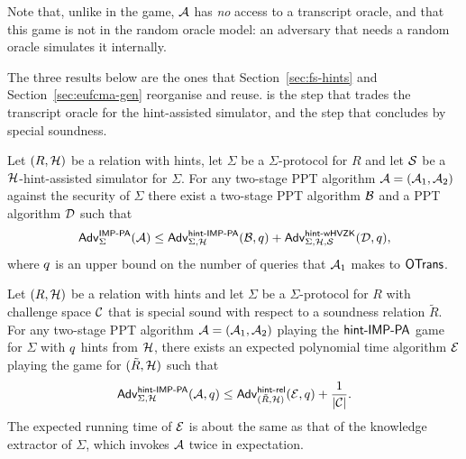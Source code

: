 Note that, unlike in the \IMPPA game, $\mathcal{A}$ has \emph{no} access to a
transcript oracle, and that this game is not in the random oracle model: an
adversary that needs a random oracle simulates it internally.

The three results below are the ones that Section~\ref{sec:fs-hints} and
Section~\ref{sec:eufcma-gen} reorganise and reuse.
 is the step that trades the transcript oracle for the
hint-assisted simulator, and  the step that concludes by
special soundness.

\begin{lemma}\label{lem:hint-imppa}
    Let $(R, \mathcal{H})$ be a relation with hints, let $\Sigma$ be a
    $\Sigma$-protocol for $R$ and let $\operatorname{\mathcal{S}}$ be a $\mathcal{H}$-hint-assisted
    simulator for $\Sigma$.
    For any two-stage PPT algorithm $\mathcal{A} = (\mathcal{A}_1, \mathcal{A}_2)$ against the
    \IMPPA security of $\Sigma$ there exist a two-stage PPT algorithm $\mathcal{B}$ and
    a PPT algorithm $\mathcal{D}$ such that
    \begin{equation}
        \mathsf{Adv}^{\mathsf{IMP}\text{-}\mathsf{PA}}_{\Sigma}(\mathcal{A}) \leq
        \mathsf{Adv}^{\mathsf{hint}\text{-}\mathsf{IMP}\text{-}\mathsf{PA}}_{\Sigma,\mathcal{H}}(\mathcal{B},q)
        + \mathsf{Adv}^{\mathsf{hint}\text{-}\mathsf{wHVZK}}_{\Sigma,\mathcal{H}, \operatorname{\mathcal{S}}}(\mathcal{D}, q),
    \end{equation}
    where $q$ is an upper bound on the number of queries that $\mathcal{A}_1$
    makes to $\mathsf{OTrans}$.
\end{lemma}

\begin{lemma}\label{lem:ss-hints}
    Let $(R, \mathcal{H})$ be a relation with hints and let $\Sigma$ be a
    $\Sigma$-protocol for $R$ with challenge space $\mathcal{C}$ that is special sound
    with respect to a soundness relation $\tilde{R}$.
    For any two-stage PPT algorithm $\mathcal{A} = (\mathcal{A}_1, \mathcal{A}_2)$ playing the
    $\mathsf{hint}\text{-}\mathsf{IMP}\text{-}\mathsf{PA}$ game for $\Sigma$ with $q$ hints from $\mathcal{H}$,
    there exists an expected polynomial time algorithm $\mathcal{E}$ playing the game
    for $(\tilde{R}, \mathcal{H})$ such that
    \begin{equation}
        \hintimppaadv{\Sigma}{\hintdistr}{\adv}{\hintnum} \leq
        \hintreladv{\tilde{R}}{\hintdistr}{\cE}{\hintnum} + \frac{1}{\abs{\cC}}.
    \end{equation}
    The expected running time of $\mathcal{E}$ is about the same as that of the
    knowledge extractor of $\Sigma$, which invokes $\mathcal{A}$ twice in expectation.
\end{lemma}

